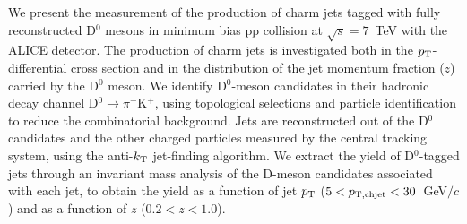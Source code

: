 \documentclass[12pt]{article}
\begin{document}
We present the measurement of the production of charm jets tagged with fully reconstructed D$^0$ mesons in minimum bias pp collision at $\sqrt{s} = 7$~TeV with the ALICE detector. 
The production of charm jets is investigated both in the $p_{\rm T}$-differential cross section and in the distribution of the jet momentum fraction ($z$) carried by the D$^0$ meson.
We identify D$^0$-meson candidates in their hadronic decay channel D$^0\rightarrow \pi^{-}$K$^{+}$, using topological selections and particle identification to reduce the combinatorial background.
Jets are reconstructed out of the D$^0$ candidates and the other charged particles measured by the central tracking system, 
using the anti-$k_{\rm T}$ jet-finding algorithm.
We extract the yield of D$^0$-tagged jets through an invariant mass analysis of the D-meson candidates associated with each jet, 
to obtain the yield as a function of jet $p_{\rm T}$ ($5<p_{\rm T, ch jet}<30$~GeV$/c$) and as a function of $z$ ($0.2<z<1.0$). 
\end{document}
